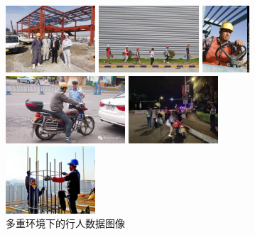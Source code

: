 \documentclass[journal]{IEEEtran}
\numberwithin{figure}{section}%
\numberwithin{table}{section}%
\numberwithin{equation}{section}
\begin{document}
\begin{figure}[h]
	
	\begin{minipage}{0.32\linewidth}
		\vspace{3pt}
		\centerline{\includegraphics[width=\textwidth,height=2.5cm]{figures/2_1.jpg}}
		\centerline{\includegraphics[width=\textwidth,height=2.5cm]{figures/2_2.jpg}}
	\end{minipage}
	\begin{minipage}{0.32\linewidth}
		\vspace{3pt}
		\centerline{\includegraphics[width=\textwidth,height=2.5cm]{figures/2_3.jpg}}
	 
		\centerline{\includegraphics[width=\textwidth,height=2.5cm]{figures/2_4.jpg}}
	\end{minipage}
	\begin{minipage}{0.32\linewidth}
		\vspace{3pt}
		\centerline{\includegraphics[width=\textwidth,height=2.5cm]{figures/2_5.jpg}}
	 
		\centerline{\includegraphics[width=\textwidth,height=2.5cm]{figures/2_6.jpg}}
	\end{minipage}
 
	\caption{多重环境下的行人数据图像}
	\label{fig4}
\end{figure}
\end{document}
